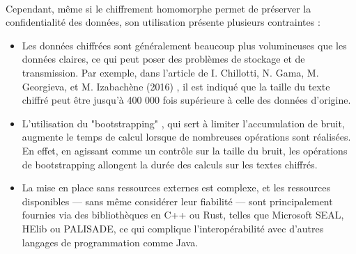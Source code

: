 \documentclass{article}
\begin{document}
$ $\\
Cependant, même si le chiffrement homomorphe permet de préserver la confidentialité des données, son utilisation présente plusieurs contraintes :  
\begin{itemize}
    \item Les données chiffrées sont généralement beaucoup plus volumineuses que les données claires, ce qui peut poser des problèmes de stockage et de transmission. Par exemple, dans l'article de I. Chillotti, N. Gama, M. Georgieva, et M. Izabachène (2016) \cite{end_size}, il est indiqué que la taille du texte chiffré peut être jusqu'à 400 000 fois supérieure à celle des données d'origine.  
    \item L'utilisation du "bootstrapping" \cite{boots}, qui sert à limiter l'accumulation de bruit, augmente le temps de calcul lorsque de nombreuses opérations sont réalisées. En effet, en agissant comme un contrôle sur la taille du bruit, les opérations de bootstrapping allongent la durée des calculs sur les textes chiffrés.  
    \item La mise en place sans ressources externes est complexe, et les ressources disponibles — sans même considérer leur fiabilité — sont principalement fournies via des bibliothèques en C++ ou Rust, telles que Microsoft SEAL, HElib ou PALISADE, ce qui complique l'interopérabilité avec d'autres langages de programmation comme Java.  
\end{itemize}
\end{document}
